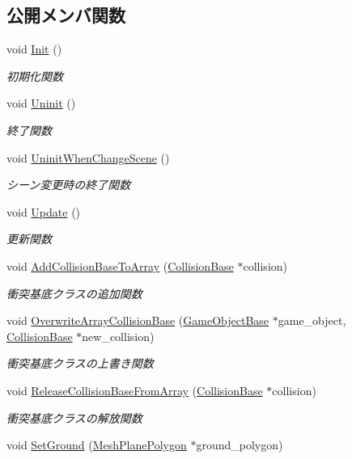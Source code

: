 \subsection*{公開メンバ関数}
\begin{DoxyCompactItemize}
\item 
void \mbox{\hyperlink{class_collision_manager_a2c5770b90b7a46a5674df008a7a57145}{Init}} ()
\begin{DoxyCompactList}\small\item\em 初期化関数 \end{DoxyCompactList}\item 
void \mbox{\hyperlink{class_collision_manager_abfa4b87f3ce102f0d173e112e7963f09}{Uninit}} ()
\begin{DoxyCompactList}\small\item\em 終了関数 \end{DoxyCompactList}\item 
void \mbox{\hyperlink{class_collision_manager_a33ce56b5a6f68d71b0f2bf733413dddb}{Uninit\+When\+Change\+Scene}} ()
\begin{DoxyCompactList}\small\item\em シーン変更時の終了関数 \end{DoxyCompactList}\item 
void \mbox{\hyperlink{class_collision_manager_a23c21d077dbfd7ca86e7c0649d775dfc}{Update}} ()
\begin{DoxyCompactList}\small\item\em 更新関数 \end{DoxyCompactList}\item 
void \mbox{\hyperlink{class_collision_manager_a42be7a26321110f5daaf1828da32f667}{Add\+Collision\+Base\+To\+Array}} (\mbox{\hyperlink{class_collision_base}{Collision\+Base}} $\ast$collision)
\begin{DoxyCompactList}\small\item\em 衝突基底クラスの追加関数 \end{DoxyCompactList}\item 
void \mbox{\hyperlink{class_collision_manager_af9c2ce87e0189cdd1256c83decc64673}{Overwrite\+Array\+Collision\+Base}} (\mbox{\hyperlink{class_game_object_base}{Game\+Object\+Base}} $\ast$game\+\_\+object, \mbox{\hyperlink{class_collision_base}{Collision\+Base}} $\ast$new\+\_\+collision)
\begin{DoxyCompactList}\small\item\em 衝突基底クラスの上書き関数 \end{DoxyCompactList}\item 
void \mbox{\hyperlink{class_collision_manager_a34318163f4256cebc7aefb95fc475030}{Release\+Collision\+Base\+From\+Array}} (\mbox{\hyperlink{class_collision_base}{Collision\+Base}} $\ast$collision)
\begin{DoxyCompactList}\small\item\em 衝突基底クラスの解放関数 \end{DoxyCompactList}\item 
void \mbox{\hyperlink{class_collision_manager_a63ce6003d8d042085d7b388a4cfa0666}{Set\+Ground}} (\mbox{\hyperlink{class_mesh_plane_polygon}{Mesh\+Plane\+Polygon}} $\ast$ground\+\_\+polygon)
\end{DoxyCompactItemize}
